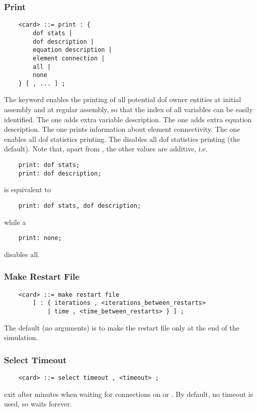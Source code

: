 \subsubsection{Print}
\begin{verbatim}
    <card> ::= print : {
        dof stats |
        dof description |
        equation description |
        element connection |
        all |
        none
    } [ , ... ] ;
\end{verbatim}
The  keyword enables the printing of all potential
dof owner entities at initial assembly and at regular assembly,
so that the index of all variables can be easily identified.
The  one adds extra variable description.
The  one adds extra equation description.
The  one prints information
about element connectivity.
The  one enables all dof statistics printing.
The  disables all dof statistics printing (the default).
Note that, apart from , the other values are additive, i.e.
\begin{verbatim}
    print: dof stats;
    print: dof description;
\end{verbatim}
is equivalent to 
\begin{verbatim}
    print: dof stats, dof description;
\end{verbatim}
while a 
\begin{verbatim}
    print: none;
\end{verbatim}
disables all.

\subsubsection{Make Restart File}
\begin{verbatim}
    <card> ::= make restart file
        [ : { iterations , <iterations_between_restarts>
            | time , <time_between_restarts> } ] ;
\end{verbatim}
The default (no arguments) is to make the restart file only at the end of
the simulation.

\subsubsection{Select Timeout}
\begin{verbatim}
    <card> ::= select timeout , <timeout> ;
\end{verbatim}
exit after  minutes when waiting for connections 
on  or .
By default, no timeout is used, so  waits forever.

